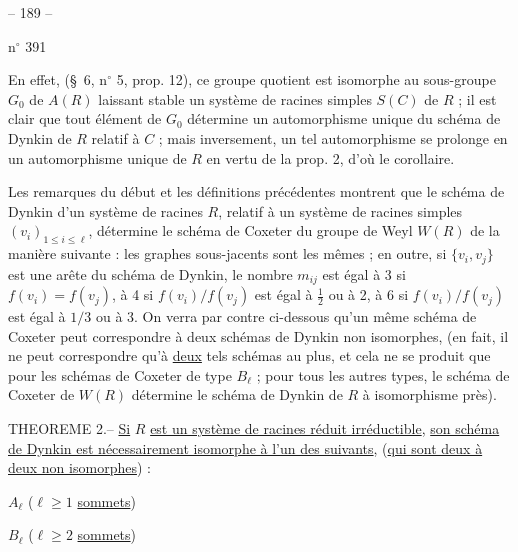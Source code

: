 
\begin{center}-- 189 --\end{center}
\hfill n$^{\circ}$ 391

En effet, (\S\ 6, n$^{\circ}$ 5, prop. 12), ce groupe quotient est isomorphe au sous-groupe
$G_0$ de $A(R)$ laissant stable un système de racines simples $S(C)$ de $R$ ; il
est clair que tout élément de $G_0$ détermine un automorphisme unique du schéma
de Dynkin de $R$ relatif à $C$ ; mais inversement, un tel automorphisme se prolonge
en un automorphisme unique de $R$ en vertu de la prop. 2, d'où le corollaire.

Les remarques du début et les définitions précédentes montrent que le schéma
de Dynkin d'un système de racines $R$, relatif à un système de racines simples
$(v_i)_{1\leq i\leq\ell}$, détermine le schéma de Coxeter du groupe de Weyl $W(R)$ de la manière
suivante : les graphes sous-jacents sont les mêmes ; en outre, si $\{v_i,v_j\}$
est une arête du schéma de Dynkin, le nombre $m_{ij}$ est égal à 3 si $f(v_i)=f(v_j)$,
à 4 si $f(v_i)/f(v_j)$ est égal à $\frac12$ ou à 2, à 6 si $f(v_i)/f(v_j)$ est égal à $1/3$ ou
à 3. On verra par contre ci-dessous qu'un même schéma de Coxeter peut correspondre
à deux schémas de Dynkin non isomorphes, (en fait, il ne peut correspondre qu'à
\uline{deux} tels schémas au plus, et cela ne se produit que pour les schémas de Coxeter
de type $B_\ell$ ; pour tous les autres types, le schéma de Coxeter de $W(R)$ détermine
le schéma de Dynkin de $R$ à isomorphisme près).

THEOREME 2.-- \uline{Si} $R$ \uline{est un système de racines réduit irréductible}, \uline{son schéma de
Dynkin est nécessairement isomorphe à l'un des suivants}, (\uline{qui sont deux à deux
non isomorphes}) :

$A_\ell$\quad
{}
\hfill ($\ell\geq1$ \uline{sommets})

$B_\ell$\quad
{}
\hfill ($\ell\geq2$ \uline{sommets})

